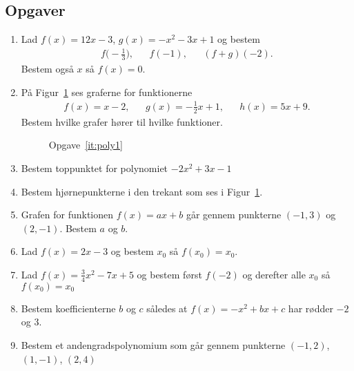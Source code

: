 \subsection{Opgaver}

\begin{enumerate}
	\item Lad $f(x)=12x-3$, $ g(x)=-x^2-3x+1$ og bestem 
	\begin{align*}
	f\Big(-\frac{1}{3}\Big),&&f(-1),&& (f+g)(-2).
	\end{align*} 
	Bestem også $x$ så $f(x)=0$.
	
	\item \label{it:poly1} På Figur~\ref{fig:poly1} ses graferne for funktionerne
	\begin{align*}
		f(x)=x-2,&& g(x)=-\frac{1}{2}x+1,&&h(x)=5x+9.
	\end{align*}
	Bestem hvilke grafer hører til hvilke funktioner.
	\begin{figure}
		\centering
		\caption{Opgave~\ref{it:poly1}}
		\label{fig:poly1}
	\end{figure}
	
	\item Bestem toppunktet for polynomiet $-2x^2+3x-1$
	
	\item Bestem hjørnepunkterne i den trekant som ses i Figur~\ref{fig:poly1}.
	
	\item Grafen for funktionen $f(x)=ax+b$ går gennem punkterne $(-1,3)$ og $(2,-1)$. Bestem $a$ og $b$.
	
	\item Lad $f(x)=2x-3$ og bestem $x_0$ så $ f(x_0)=x_0 $.
	
	\item Lad $ f(x)=\frac{3}{4}x^2-7x+5 $ og bestem først $f(-2)$ og derefter alle $x_0$ så $ f(x_0)=x_0 $
	
	\item Bestem koefficienterne $b$ og $c$ således at $f(x)=-x^2+bx+c$ har rødder $-2$ og $3$.
	
	\item Bestem et andengradspolynomium som går gennem punkterne $(-1,2)$, $(1,-1)$, $(2,4)$
	

\end{enumerate}
